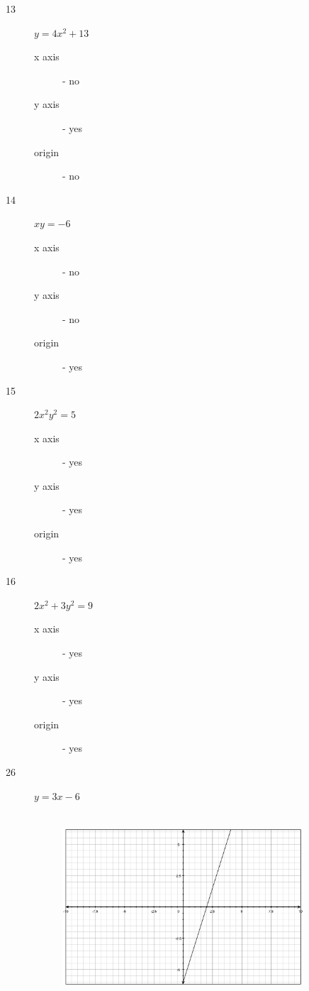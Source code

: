 \documentclass[fleqn,addpoints]{exam}
\begin{document}
\begin{description}
\item[13]
\( y = 4x^2 + 13 \)
\begin{description}
  \item[x axis] - no
  \item[y axis] - yes
  \item[origin] - no
\end{description}

\item[14]
\( xy = -6 \)
\begin{description}
  \item[x axis] - no
  \item[y axis] - no
  \item[origin] - yes
\end{description}

\item[15]
\( 2x^2y^2 = 5 \)
\begin{description}
  \item[x axis] - yes
  \item[y axis] - yes
  \item[origin] - yes
\end{description}

\item[16]
\( 2x^2 + 3y^2 = 9 \)
\begin{description}
  \item[x axis] - yes
  \item[y axis] - yes
  \item[origin] - yes
\end{description}

\item[26]
$y=3x-6$
\begin{figure}[H]
  \includegraphics[width=9cm,height=7cm]{p318/26}
\end{figure}


\end{description}
\end{document}
